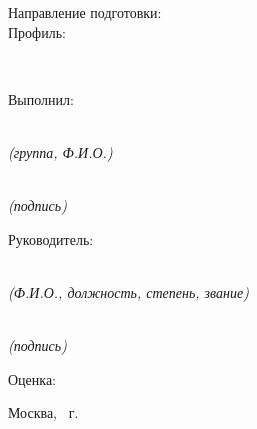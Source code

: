 \begin{titlepage}
    \noindent
    \begin{minipage}[t]{0.5\textwidth}
        \raggedright
        Направление подготовки: \\[5pt]
        Профиль:
    \end{minipage}
    \begin{minipage}[t]{0.5\textwidth}
        \raggedleft
        \specialization \\[5pt]
        \trainingProfile
    \end{minipage}
    \vspace{1cm}

    \noindent
    \begin{minipage}[t]{0.2\textwidth}
        \raggedright
        Выполнил:
    \end{minipage}
    \begin{minipage}[t]{0.55\textwidth}
        \centering
        \underline{} \\
        {\small\textit{(группа, Ф.И.О.)}}
    \end{minipage}
    \hfill
    \begin{minipage}[t]{0.18\textwidth}
        \centering
        \underline{\makebox[2.5cm]{\vphantom{\lastName}}} \\
        {\small\textit{(подпись)}}
    \end{minipage}
    \vspace{0.8cm}

    \noindent
    \begin{minipage}[t]{0.2\textwidth}
        \raggedright
        Руководитель:
    \end{minipage}
    \begin{minipage}[t]{0.55\textwidth}
        \centering
        \underline{\makebox[8cm]{\supervisor}} \\
        {\small\textit{(Ф.И.О., должность, степень, звание)}}
    \end{minipage}
    \hfill
    \begin{minipage}[t]{0.18\textwidth}
        \centering
        \underline{\makebox[2.5cm]{\vphantom{\supervisor}}} \\
        {\small\textit{(подпись)}}
    \end{minipage}
    \vspace{1cm}

    \noindent
    Оценка:~~~\underline{\makebox[3cm]{\vphantom{\supervisor}}}

    \vfil

    \enlargethispage{3cm}
    \centering
    \small Москва, \yearFooter~г.

\end{titlepage}
